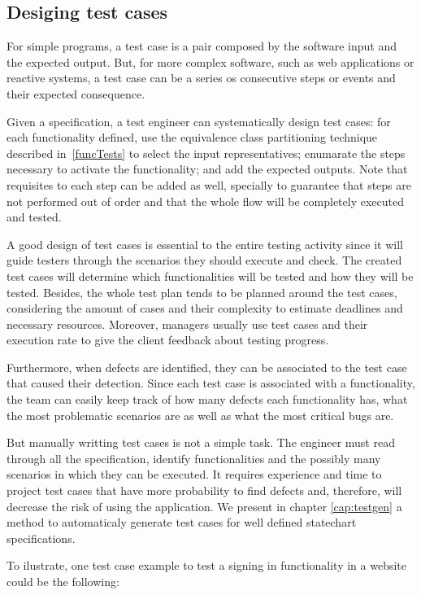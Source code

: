 \subsection{Desiging test cases}
\label{sec:testcasesdesign}


For simple programs, a test case is a pair composed by the software input and the expected output. But, for more complex software, such as web applications or reactive systems, a test case can be a series os consecutive steps or events and their expected consequence.

Given a specification, a test engineer can systematically design test cases: for each functionality defined, use the equivalence class partitioning technique described in~\ref{funcTests} to select the input representatives; enumarate the steps necessary to activate the functionality; and add the expected outputs. Note that requisites to each step can be added as well, specially to guarantee that steps are not performed out of order and that the whole flow will be completely executed and tested.

A good design of test cases is essential to the entire testing activity since it will guide testers through the scenarios they should execute and check. The created test cases will determine which functionalities will be tested and how they will be tested. Besides, the whole test plan tends to be planned around the test cases, considering the amount of cases and their complexity to estimate deadlines and necessary resources. Moreover, managers usually use test cases and their execution rate to give the client feedback about testing progress.

Furthermore, when defects are identified, they can be associated to the test case that caused their detection. Since each test case is associated with a functionality, the team can easily keep track of how many defects each functionality has, what the most problematic scenarios are as well as what the most critical bugs are.

But manually writting test cases is not a simple task. The engineer must read through all the specification, identify functionalities and the possibly many scenarios in which they can be executed. It requires experience and time to project test cases that have more probability to find defects and, therefore, will decrease the risk of using the application. We present in chapter \ref{cap:testgen} a method to automaticaly generate test cases for well defined statechart specifications.

To ilustrate, one test case example to test a signing in functionality in a website could be the following:

